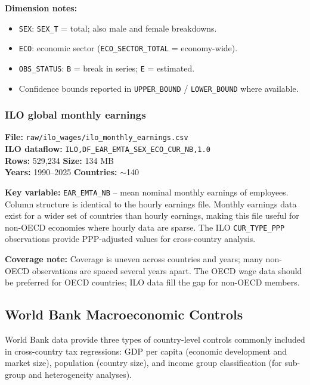 \documentclass[11pt,a4paper]{article}
\newcommand{\code}[1]{\texttt{#1}}
\begin{document}
\noindent\textbf{Dimension notes:}
\begin{itemize}[noitemsep]
    \item \texttt{SEX}: \texttt{SEX\_T} = total; also male and female breakdowns.
    \item \texttt{ECO}: economic sector (\texttt{ECO\_SECTOR\_TOTAL} = economy-wide).
    \item \texttt{OBS\_STATUS}: \texttt{B} = break in series; \texttt{E} = estimated.
    \item Confidence bounds reported in \texttt{UPPER\_BOUND} / \texttt{LOWER\_BOUND} where available.
\end{itemize}

\subsubsection{ILO global monthly earnings}

\textbf{File:} \texttt{raw/ilo\_wages/ilo\_monthly\_earnings.csv}\\
\textbf{ILO dataflow:} \texttt{ILO,DF\_EAR\_EMTA\_SEX\_ECO\_CUR\_NB,1.0}\\
\textbf{Rows:} 529{,}234 \quad \textbf{Size:} 134 MB\\
\textbf{Years:} 1990--2025 \quad \textbf{Countries:} $\sim$140

\noindent\textbf{Key variable:} \code{EAR\_EMTA\_NB} -- mean nominal monthly earnings of employees.  Column structure is identical to the hourly earnings file.  Monthly earnings data exist for a wider set of countries than hourly earnings, making this file useful for non-OECD economies where hourly data are sparse.  The ILO \texttt{CUR\_TYPE\_PPP} observations provide PPP-adjusted values for cross-country analysis.

\noindent\textbf{Coverage note:} Coverage is uneven across countries and years; many non-OECD observations are spaced several years apart.  The OECD wage data should be preferred for OECD countries; ILO data fill the gap for non-OECD members.

\subsection{World Bank Macroeconomic Controls}\label{sec:worldbank}


World Bank data provide three types of country-level controls commonly included in cross-country tax regressions: GDP per capita (economic development and market size), population (country size), and income group classification (for sub-group and heterogeneity analyses).
\end{document}
